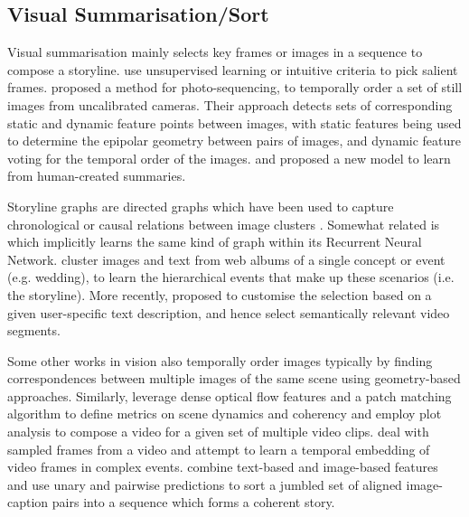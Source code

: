 \documentclass[a4paper,fleqn]{cas-sc}
\begin{document}
\subsection{Visual Summarisation/Sort} Visual summarisation mainly selects key frames or images in a sequence to compose a storyline. \cite{khosla2013} use unsupervised learning or intuitive criteria to pick salient frames. \cite{PhotoSequencing2014} proposed a method for photo-sequencing, to temporally order a set of still images from uncalibrated cameras. Their approach detects sets of corresponding static and dynamic feature points between images, with static features being used to determine the epipolar geometry between pairs of images, and dynamic feature voting for the temporal order of the images. \cite{Gong2014} and \cite{Zhang2016} proposed a new model to learn from human-created summaries. 

Storyline graphs are directed graphs which have been used to capture chronological or causal relations between image clusters \citep{Kim2014}. Somewhat related is \citet{Sigurdsson2016} which implicitly learns the same kind of graph within its Recurrent Neural Network.
\citet{Bosselut2016} cluster images and text from web albums of a single concept or event (e.g. wedding), to learn the hierarchical events that make up these scenarios (i.e. the storyline). More recently, \cite{Choi2017} proposed to customise the selection based on a given  user-specific text description, and hence select semantically relevant video segments. 

Some other works in vision \citep{Basha2014,Pickup2014} also temporally order images typically by finding correspondences between multiple images of the same scene using geometry-based approaches. Similarly, \cite{Choi2016} leverage dense optical flow features and a patch matching algorithm to define metrics on scene dynamics and coherency and employ plot analysis to compose a video for a given set of multiple video clips. 
\cite{Ramanathan2015} deal with sampled frames from a video and attempt to learn a temporal embedding of video frames in complex events. 
\cite{SortStory2016} combine text-based and image-based features and use  unary and pairwise predictions to sort a jumbled set of aligned image-caption pairs into a sequence which forms a coherent story.
\end{document}
